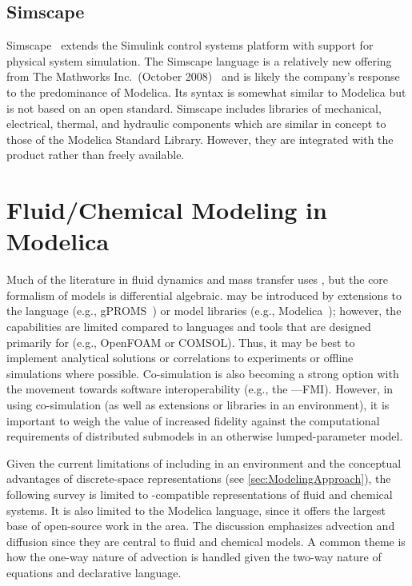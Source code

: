 \subsection{Simscape}

Simscape~\cite{Mathworks2012, SimPowerSystems5} extends the Simulink control systems platform with support for physical system simulation.  The Simscape language is a relatively new offering from The Mathworks Inc.\ (October 2008)~\cite{MathWorks2008} and is likely the company's response to the predominance of Modelica.  Its syntax is somewhat similar to Modelica but is not based on an open standard.  Simscape includes libraries of mechanical, electrical, thermal, and hydraulic components which are similar in concept to those of the Modelica Standard Library.  However, they are integrated with the product rather than freely available.


\section{Fluid\slash{}Chemical Modeling in Modelica}
\label{sec:Upstream}

Much of the literature in fluid dynamics and mass transfer uses , but the core formalism of  models is differential algebraic.   may be introduced by extensions to the  language (e.g., gPROMS~\cite{Oh1996}) or model libraries (e.g., Modelica~\cite{Modelica3.3}); however, the capabilities are limited compared to languages and tools that are designed primarily for  (e.g., OpenFOAM or COMSOL).  Thus, it may be best to implement analytical solutions or correlations to experiments or offline  simulations where possible.  Co-simulation is also becoming a strong option with the movement towards software interoperability (e.g., the ---FMI).  However, in using co-simulation (as well as  extensions or libraries in an  environment), it is important to weigh the value of increased fidelity against the computational requirements of distributed submodels in an otherwise lumped-parameter model.

Given the current limitations of including  in an  environment and the conceptual advantages of discrete-space representations (see \autoref{sec:ModelingApproach}), the following survey is limited to -compatible representations of fluid and chemical systems.  It is also limited to the Modelica language, since it offers the largest base of open-source work in the area.  The discussion emphasizes advection and diffusion since they are central to fluid and chemical models.  A common theme is how the one-way nature of advection is handled given the two-way nature of equations and declarative language.  %

